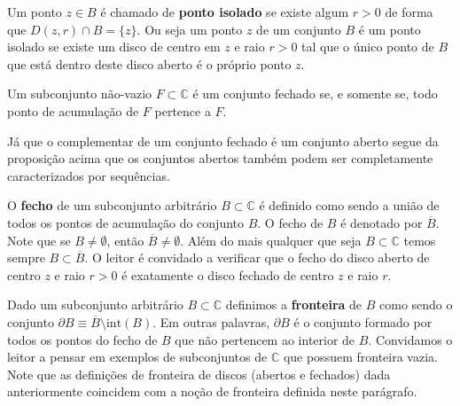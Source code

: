 Um ponto $z\in B$ é chamado de {\bf ponto isolado} 
se existe algum $r>0$ de forma que $D(z,r)\cap B = \{z\}$. Ou seja um ponto $z$ de um conjunto $B$
é um ponto isolado se existe um disco de centro em $z$ e raio $r>0$ tal que 
o único ponto de $B$ que está dentro deste disco aberto é o próprio ponto $z$.

\begin{proposicao}\label{prop-caract-fechados-sequencias}
Um subconjunto não-vazio $F\subset\mathbb{C}$ é um conjunto fechado se, e somente se, todo ponto 
de acumulação de $F$ pertence a $F$. 
\end{proposicao}
Já que o complementar de um conjunto fechado é um conjunto aberto segue da proposição 
acima que os conjuntos abertos também podem ser completamente caracterizados 
por sequências.

\medskip 

O {\bf fecho} de um subconjunto arbitrário $B\subset \mathbb{C}$ é definido como sendo 
a união de todos os pontos de acumulação do conjunto $B$. O fecho de $B$ é denotado por $\overline{B}$. 
Note que se $B\neq \emptyset$, então $\overline{B}\neq \emptyset$. Além do mais 
qualquer que seja $B\subset\mathbb{C}$ temos sempre $B\subset \overline{B}$.
O leitor é convidado a verificar que o fecho do disco aberto de centro $z$ e raio $r>0$
é exatamente o disco fechado de centro $z$ e raio $r$.

\medskip 

Dado um subconjunto arbitrário $B\subset \mathbb{C}$ definimos a {\bf fronteira} de $B$
como sendo o conjunto $\partial B \equiv \overline{B}\setminus \mathrm{int}(B)$.
Em outras palavras, $\partial B$ é o conjunto formado por todos os pontos do fecho de $B$
que não pertencem ao interior de $B$. 
Convidamos o leitor a pensar em exemplos de subconjuntos de $\mathbb{C}$ 
que possuem fronteira vazia. 
Note que as definições de fronteira de discos (abertos e fechados) dada anteriormente 
coincidem com a noção de fronteira definida neste parágrafo. 


